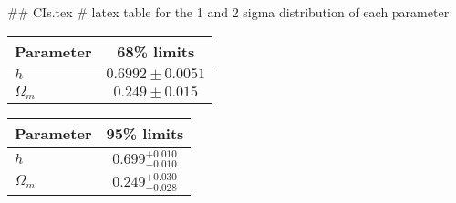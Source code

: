 ## CIs.tex
# latex table for the 1 and 2 sigma distribution of each parameter

\begin{tabular} { l  c}
 Parameter &  68\% limits\\
\hline
{\boldmath$h              $} & $0.6992\pm 0.0051          $\\
{\boldmath$\Omega_m       $} & $0.249\pm 0.015            $\\
\hline
\end{tabular}

\begin{tabular} { l  c}
 Parameter &  95\% limits\\
\hline
{\boldmath$h              $} & $0.699^{+0.010}_{-0.010}   $\\
{\boldmath$\Omega_m       $} & $0.249^{+0.030}_{-0.028}   $\\
\hline
\end{tabular}
